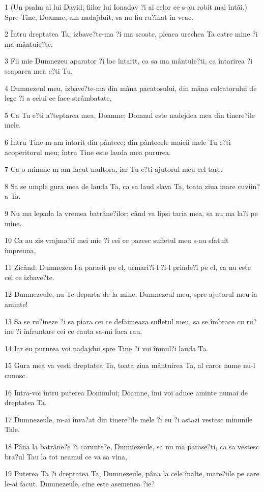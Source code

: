 \par 1 (Un psalm al lui David; fiilor lui Ionadav ?i ai celor ce s-au robit mai întâi.) Spre Tine, Doamne, am nadajduit, sa nu fiu ru?inat în veac.
\par 2 Întru dreptatea Ta, izbave?te-ma ?i ma scoate, pleaca urechea Ta catre mine ?i ma mântuie?te.
\par 3 Fii mie Dumnezeu aparator ?i loc întarit, ca sa ma mântuie?ti, ca întarirea ?i scaparea mea e?ti Tu.
\par 4 Dumnezeul meu, izbave?te-ma din mâna pacatosului, din mâna calcatorului de lege ?i a celui ce face strâmbatate,
\par 5 Ca Tu e?ti a?teptarea mea, Doamne; Domnul este nadejdea mea din tinere?ile mele.
\par 6 Întru Tine m-am întarit din pântece; din pântecele maicii mele Tu e?ti acoperitorul meu; întru Tine este lauda mea pururea.
\par 7 Ca o minune m-am facut multora, iar Tu e?ti ajutorul meu cel tare.
\par 8 Sa se umple gura mea de lauda Ta, ca sa laud slava Ta, toata ziua mare cuviin?a Ta.
\par 9 Nu ma lepada la vremea batrâne?ilor; când va lipsi taria mea, sa nu ma la?i pe mine.
\par 10 Ca au zis vrajma?ii mei mie ?i cei ce pazesc sufletul meu s-au sfatuit împreuna,
\par 11 Zicând: Dumnezeu l-a parasit pe el, urmari?i-l ?i-l prinde?i pe el, ca nu este cel ce izbave?te.
\par 12 Dumnezeule, nu Te departa de la mine; Dumnezeul meu, spre ajutorul meu ia aminte!
\par 13 Sa se ru?ineze ?i sa piara cei ce defaimeaza sufletul meu, sa se îmbrace cu ru?ine ?i înfruntare cei ce cauta sa-mi faca rau.
\par 14 Iar eu pururea voi nadajdui spre Tine ?i voi înmul?i lauda Ta.
\par 15 Gura mea va vesti dreptatea Ta, toata ziua mântuirea Ta, al caror nume nu-l cunosc.
\par 16 Intra-voi întru puterea Domnului; Doamne, îmi voi aduce aminte numai de dreptatea Ta.
\par 17 Dumnezeule, m-ai înva?at din tinere?ile mele ?i eu ?i astazi vestesc minunile Tale.
\par 18 Pâna la batrâne?e ?i carunte?e, Dumnezeule, sa nu ma parase?ti, ca sa vestesc bra?ul Tau la tot neamul ce va sa vina,
\par 19 Puterea Ta ?i dreptatea Ta, Dumnezeule, pâna la cele înalte, mare?iile pe care le-ai facut. Dumnezeule, cine este asemenea ?ie?
